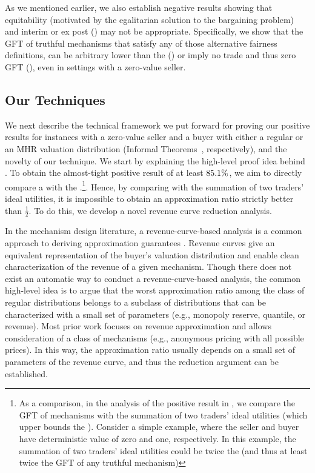 As we mentioned earlier, we also establish negative results showing that equitability (motivated by the egalitarian solution \citep{Kal-77,Mye-77} to the bargaining problem) and interim or ex post {\ksfairness} () may not be appropriate. Specifically, we show that the GFT of truthful mechanisms that satisfy any of those alternative fairness definitions, can be arbitrary lower than the {\SecondBest} () or imply no trade and thus zero GFT (), even in settings with a zero-value seller.

\subsection{Our Techniques} 
\label{subsec:intro:techniques}
We next describe the technical framework we put forward for proving our positive results for instances with a zero-value seller and a buyer with either a regular or an MHR valuation distribution (Informal Theorems~, respectively), {and the novelty of our technique}. We start by explaining the high-level proof idea behind . To obtain the almost-tight positive result of at least ${85.1\%}$, we aim to directly compare a {\ksfair} {\FixPrice} with the {\SecondBest}.\footnote{As a comparison, in the analysis of the positive result in , we compare the GFT of {\ksfair} mechanisms with the summation of two traders' ideal utilities (which upper bounds the {\SecondBest}). Consider a simple example, where the seller and buyer have deterministic value of zero and one, respectively. In this example, the summation of two traders' ideal utilities could  be twice the {\FirstBest} (and thus at least twice the GFT of any truthful mechanism)}. Hence, by comparing with the summation of two traders' ideal utilities, it is impossible to obtain an approximation ratio strictly better than $\frac{1}{2}$. To do this, we develop a novel revenue curve reduction analysis. 

In the mechanism design literature, a revenue-curve-based analysis is a common approach to deriving approximation guarantees \citep[e.g.,][]{FILS-15,DRY-15,AB-18,AHNPY-18,JLQTX-19,BCW-22,FHL-21,ABB-22,JL-23}. Revenue curves \citep{BR-89} give an equivalent representation of the buyer's valuation distribution and enable clean characterization of the revenue of a given mechanism. Though there does not exist an automatic way to conduct a revenue-curve-based analysis, the common high-level idea is to argue that the worst approximation ratio among the class of regular distributions belongs to a subclass of distributions that can be characterized with a small set of parameters (e.g., monopoly reserve, quantile, or revenue). Most prior work focuses on revenue approximation and allows consideration of a class of mechanisms (e.g., anonymous pricing with all possible prices). In this way, the approximation ratio usually depends on a small set of parameters of the revenue curve, and thus the reduction argument can be established.

